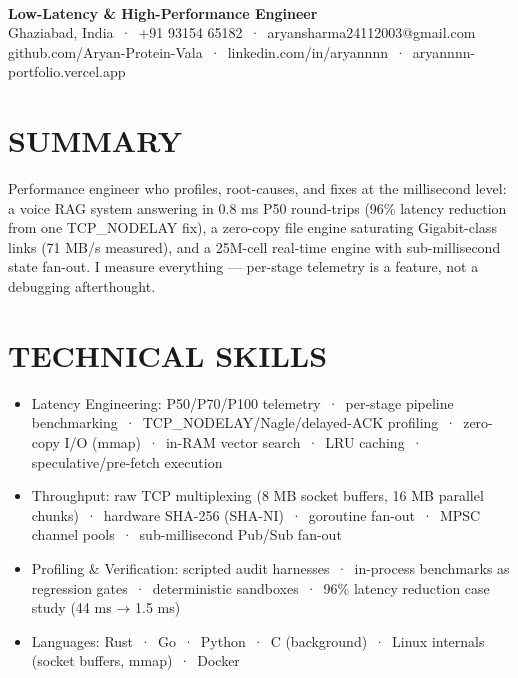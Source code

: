 \documentclass[9pt]{article}
\begin{document}
\\[3pt]
{\large\bfseries Low-Latency \& High-Performance Engineer}\\[3pt]
{\small\color{greyc} Ghaziabad, India \,·\, +91 93154 65182 \,·\, aryansharma24112003@gmail.com}\vspace{-2pt}
{\small\color{greyc} github.com/Aryan-Protein-Vala \,·\, linkedin.com/in/aryannnn \,·\, aryannnn-portfolio.vercel.app}\vspace{-2pt}
\section*{SUMMARY}
Performance engineer who profiles, root-causes, and fixes at the millisecond level: a voice RAG system answering in 0.8 ms P50 round-trips (96\% latency reduction from one TCP\_NODELAY fix), a zero-copy file engine saturating Gigabit-class links (71 MB/s measured), and a 25M-cell real-time engine with sub-millisecond state fan-out. I measure everything  ---  per-stage telemetry is a feature, not a debugging afterthought.
\vspace{1pt}
\section*{TECHNICAL SKILLS}
\begin{itemize}[leftmargin=11pt,itemsep=0pt,topsep=1pt,parsep=0pt]
\item Latency Engineering: P50/P70/P100 telemetry \,·\, per-stage pipeline benchmarking \,·\, TCP\_NODELAY/Nagle/delayed-ACK profiling \,·\, zero-copy I/O (mmap) \,·\, in-RAM vector search \,·\, LRU caching \,·\, speculative/pre-fetch execution
\item Throughput: raw TCP multiplexing (8 MB socket buffers, 16 MB parallel chunks) \,·\, hardware SHA-256 (SHA-NI) \,·\, goroutine fan-out \,·\, MPSC channel pools \,·\, sub-millisecond Pub/Sub fan-out
\item Profiling \& Verification: scripted audit harnesses \,·\, in-process benchmarks as regression gates \,·\, deterministic sandboxes \,·\, 96\% latency reduction case study (44 ms → 1.5 ms)
\item Languages: Rust \,·\, Go \,·\, Python \,·\, C (background) \,·\, Linux internals (socket buffers, mmap) \,·\, Docker
\end{itemize}
\end{document}
